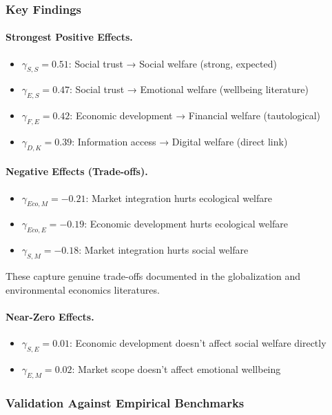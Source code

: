 \subsubsection{Key Findings}

\paragraph{Strongest Positive Effects.}
\begin{itemize}
    \item $\gamma_{S,S} = 0.51$: Social trust → Social welfare (strong, expected)
    \item $\gamma_{E,S} = 0.47$: Social trust → Emotional welfare (wellbeing literature)
    \item $\gamma_{F,E} = 0.42$: Economic development → Financial welfare (tautological)
    \item $\gamma_{D,K} = 0.39$: Information access → Digital welfare (direct link)
\end{itemize}

\paragraph{Negative Effects (Trade-offs).}
\begin{itemize}
    \item $\gamma_{Eco,M} = -0.21$: Market integration hurts ecological welfare
    \item $\gamma_{Eco,E} = -0.19$: Economic development hurts ecological welfare
    \item $\gamma_{S,M} = -0.18$: Market integration hurts social welfare
\end{itemize}

These capture genuine trade-offs documented in the globalization and environmental economics literatures.

\paragraph{Near-Zero Effects.}
\begin{itemize}
    \item $\gamma_{S,E} = 0.01$: Economic development doesn't affect social welfare directly
    \item $\gamma_{E,M} = 0.02$: Market scope doesn't affect emotional wellbeing
\end{itemize}

\subsubsection{Validation Against Empirical Benchmarks}


